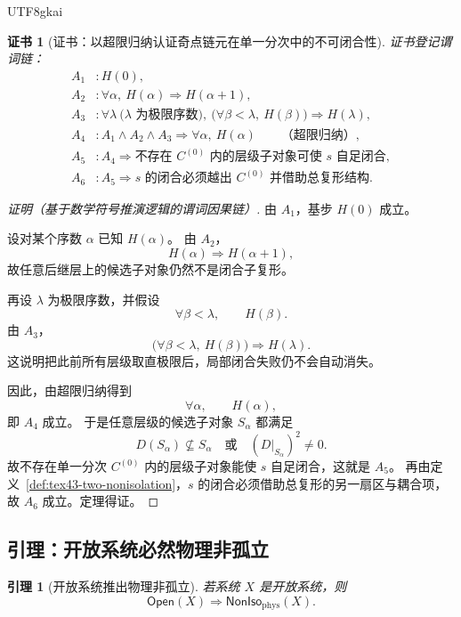 \documentclass[12pt]{article}
\newtheorem{lemma}{引理}[section]
\newtheorem{Certificate}{证书}[section]
\begin{document}
\begin{CJK*}{UTF8}{gkai}
\begin{Certificate}[证书：以超限归纳认证奇点链元在单一分次中的不可闭合性]
\label{cert:tex43-singular-local-failure}
证书登记谓词链：
\[
\begin{aligned}
  A_1 &: H(0),\\
  A_2 &: \forall \alpha,\ H(\alpha)\Rightarrow H(\alpha+1),\\
  A_3 &: \forall \lambda\ \big(\lambda\text{ 为极限序数}\big),\
         \Big(\forall \beta<\lambda,\ H(\beta)\Big)\Rightarrow H(\lambda),\\
  A_4 &: A_1\wedge A_2\wedge A_3 \Rightarrow
         \forall \alpha,\ H(\alpha)\qquad\text{（超限归纳）},\\
  A_5 &: A_4 \Rightarrow
         \text{不存在 }C^{(0)}\text{ 内的层级子对象可使 }s\text{ 自足闭合},\\
  A_6 &: A_5 \Rightarrow
         s\text{ 的闭合必须越出 }C^{(0)}\text{ 并借助总复形结构}.
\end{aligned}
\]
\end{Certificate}

\begin{proof}[证明（基于数学符号推演逻辑的谓词因果链）]
由 $A_1$，基步 $H(0)$ 成立。

设对某个序数 $\alpha$ 已知 $H(\alpha)$。
由 $A_2$，
\[
  H(\alpha)\Rightarrow H(\alpha+1),
\]
故任意后继层上的候选子对象仍然不是闭合子复形。

再设 $\lambda$ 为极限序数，并假设
\[
  \forall \beta<\lambda,\qquad H(\beta).
\]
由 $A_3$，
\[
  \Big(\forall \beta<\lambda,\ H(\beta)\Big)\Rightarrow H(\lambda).
\]
这说明把此前所有层级取直极限后，局部闭合失败仍不会自动消失。

因此，由超限归纳得到
\[
  \forall \alpha,\qquad H(\alpha),
\]
即 $A_4$ 成立。
于是任意层级的候选子对象 $S_\alpha$ 都满足
\[
  D(S_\alpha)\not\subseteq S_\alpha
  \quad\text{或}\quad
  (D|_{S_\alpha})^2\neq 0.
\]
故不存在单一分次 $C^{(0)}$ 内的层级子对象能使 $s$ 自足闭合，这就是 $A_5$。
再由定义~\ref{def:tex43-two-nonisolation}，$s$ 的闭合必须借助总复形的另一扇区与耦合项，
故 $A_6$ 成立。定理得证。
\end{proof}

\subsection{引理：开放系统必然物理非孤立}
\label{subsec:tex43-ch6-lemma}

\begin{lemma}[开放系统推出物理非孤立]
\label{lem:tex43-open-phys-noniso}
若系统 $X$ 是开放系统，则
\[
  \mathsf{Open}(X)\Rightarrow \mathsf{NonIso}_{\mathrm{phys}}(X).
\]
\end{lemma}


\end{CJK*}
\end{document}
